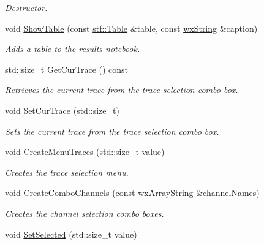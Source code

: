\begin{DoxyCompactItemize}
\begin{DoxyCompactList}\small\item\em Destructor. \item\end{DoxyCompactList}\item 
void \hyperlink{classwxStfChildFrame_a5eed0f028a05cfd1d967baddd926808e}{ShowTable} (const \hyperlink{classstf_1_1Table}{stf::Table} \&table, const \hyperlink{classwxString}{wxString} \&caption)
\begin{DoxyCompactList}\small\item\em Adds a table to the results notebook. \item\end{DoxyCompactList}\item 
std::size\_\-t \hyperlink{classwxStfChildFrame_a5d3d4ccb9139d9b89a1d8c3b5274bf44}{GetCurTrace} () const 
\begin{DoxyCompactList}\small\item\em Retrieves the current trace from the trace selection combo box. \item\end{DoxyCompactList}\item 
void \hyperlink{classwxStfChildFrame_ac4951640416b40c7ef770972b2861a96}{SetCurTrace} (std::size\_\-t)
\begin{DoxyCompactList}\small\item\em Sets the current trace from the trace selection combo box. \item\end{DoxyCompactList}\item 
void \hyperlink{classwxStfChildFrame_a8bf15457066b27f81c4ce7f6efee0968}{CreateMenuTraces} (std::size\_\-t value)
\begin{DoxyCompactList}\small\item\em Creates the trace selection menu. \item\end{DoxyCompactList}\item 
void \hyperlink{classwxStfChildFrame_ad2ae8f658f6cf4e5ab293fce15c2ef72}{CreateComboChannels} (const wxArrayString \&channelNames)
\begin{DoxyCompactList}\small\item\em Creates the channel selection combo boxes. \item\end{DoxyCompactList}\item 
void \hyperlink{classwxStfChildFrame_a1378a98bc5cbb3983398cbaa4df07b14}{SetSelected} (std::size\_\-t value)

\end{DoxyCompactItemize}
